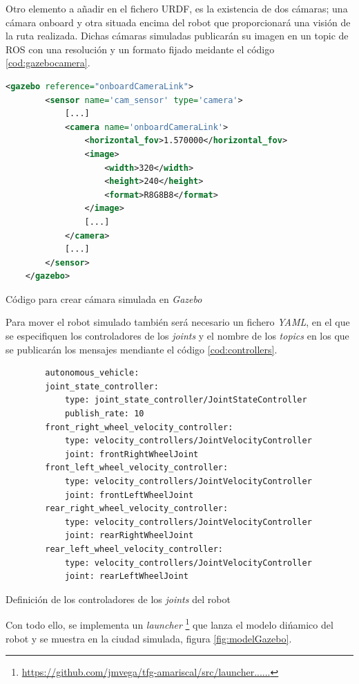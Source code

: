 Otro elemento a añadir en el fichero URDF, es la existencia de dos cámaras; una cámara onboard y otra situada encima del robot que proporcionará una visión de la ruta realizada. Dichas cámaras simuladas publicarán su imagen en un topic de ROS con una resolución y un formato fijado meidante el código \ref{cod:gazebocamera}.\\

\begin{code}[h]
	\begin{lstlisting}[language=XML]
	<gazebo reference="onboardCameraLink">
		<sensor name='cam_sensor' type='camera'>
			[...]
			<camera name='onboardCameraLink'>
				<horizontal_fov>1.570000</horizontal_fov>
				<image>
					<width>320</width>
					<height>240</height>
					<format>R8G8B8</format>
				</image>
				[...]
			</camera>
			[...]
		</sensor>
	</gazebo>
	\end{lstlisting}
	\caption[Código para crear cámara simulada en \textit{Gazebo}]{Código para crear cámara simulada en \textit{Gazebo}}
	\label{cod:gazebocamera}
\end{code}

Para mover el robot simulado también será necesario un fichero \textit{YAML}, en el que se especifiquen los controladores de los \textit{joints} y el nombre de los \textit{topics} en los que se publicarán los mensajes mendiante el código \ref{cod:controllers}.\\

\begin{code}[h]
	\begin{lstlisting}
		autonomous_vehicle:
		joint_state_controller:
			type: joint_state_controller/JointStateController
			publish_rate: 10
		front_right_wheel_velocity_controller:
			type: velocity_controllers/JointVelocityController
			joint: frontRightWheelJoint
		front_left_wheel_velocity_controller:
			type: velocity_controllers/JointVelocityController
			joint: frontLeftWheelJoint
		rear_right_wheel_velocity_controller:
			type: velocity_controllers/JointVelocityController
			joint: rearRightWheelJoint
		rear_left_wheel_velocity_controller:
			type: velocity_controllers/JointVelocityController
			joint: rearLeftWheelJoint
	\end{lstlisting}
	\caption[Definición de los controladores de los \textit{joints} del robot]{Definición de los controladores de los \textit{joints} del robot}
	\label{cod:controllers}
\end{code}

Con todo ello, se implementa un \textit{launcher} \footnote{\url{https://github.com/jmvega/tfg-amariscal/src/launcher......}} que lanza el modelo dińamico del robot y se muestra en la ciudad simulada, figura \ref{fig:modelGazebo}.

